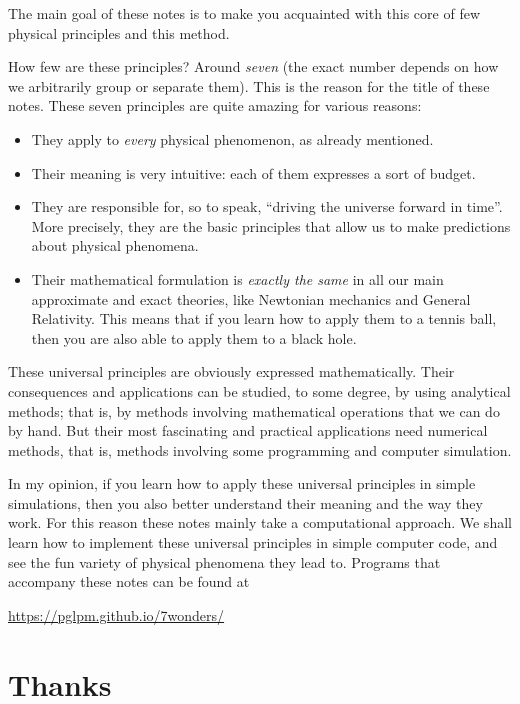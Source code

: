 \documentclass[a4paper,12pt,%
onecolumn,oneside,titlepage,%
british%
]{memoir}
\newcommand{\addsec}[1]{\section*{#1}\addcontentsline{toc}{section}{#1}}
\renewcommand*{\|}[1][]{\nonscript\:#1\vert\nonscript\:\mathopen{}}
\begin{document}
\medskip

The main goal of these notes is to make you acquainted with this core of few physical principles and this method.

How few are these principles? Around \emph{seven} (the exact number depends on how we arbitrarily group or separate them). This is the reason for the title of these notes. These seven principles are quite amazing for various reasons:
\begin{itemize}
\item They apply to \emph{every} physical phenomenon, as already mentioned.
\item Their meaning is very intuitive: each of them expresses a sort of budget.
\item They are responsible for, so to speak, \enquote{driving the universe forward in time}. More precisely, they are the basic principles that allow us to make predictions about physical phenomena.
\item Their mathematical formulation is \emph{exactly the same} in all our main approximate and exact theories, like Newtonian mechanics and General Relativity. This means that if you learn how to apply them to a tennis ball, then you are also able to apply them to a black hole.
\end{itemize}

\medskip

These universal principles are obviously expressed mathematically. Their consequences and applications can be studied, to some degree, by using analytical methods; that is, by methods involving mathematical operations that we can do by hand. But their most fascinating and practical applications need numerical methods, that is, methods involving some programming and computer simulation.

In my opinion, if you learn how to apply these universal principles in simple simulations, then you also better understand their meaning and the way they work. For this reason these notes mainly take a computational approach. We shall learn how to implement these universal principles in simple computer code, and see the fun variety of physical phenomena they lead to. Programs that accompany these notes can be found at
\begin{center}
  \url{https://pglpm.github.io/7wonders/}
\end{center}

\iftrue
\addsec{Thanks}
\label{sec:thanks}
\end{document}
